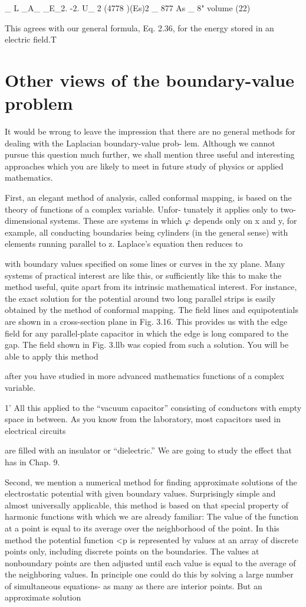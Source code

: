 _ L _A_ _E_2. -2.
U_ 2 (4778 )(Es)2 _ 877 As _ 8" volume (22)

This agrees with our general formula, Eq. 2.36, for the energy stored
in an electric field.T

\section{Other views of the boundary-value problem}

It would be wrong to leave the impression that there are no general
methods for dealing with the Laplacian boundary-value prob-
lem. Although we cannot pursue this question much further, we
shall mention three useful and interesting approaches which you are
likely to meet in future study of physics or applied mathematics.

First, an elegant method of analysis, called conformal mapping,
is based on the theory of functions of a complex variable. Unfor-
tunately it applies only to two-dimensional systems. These are systems
in which $\varphi$ depends only on x and y, for example, all conducting
boundaries being cylinders (in the general sense) with elements
running parallel to z. Laplace's equation then reduces to

with boundary values specified on some lines or curves in the xy
plane. Many systems of practical interest are like this, or sufficiently
like this to make the method useful, quite apart from its intrinsic
mathematical interest. For instance, the exact solution for the potential
around two long parallel strips is easily obtained by the
method of conformal mapping. The field lines and equipotentials
are shown in a cross-section plane in Fig. 3.16. This provides us
with the edge field for any parallel-plate capacitor in which the edge
is long compared to the gap. The field shown in Fig. 3.llb was
copied from such a solution. You will be able to apply this method

after you have studied in more advanced mathematics functions of
a complex variable.

1' All this applied to the ``vacuum capacitor'' consisting of conductors with empty space
in between. As you know from the laboratory, most capacitors used in electrical circuits

are filled with an insulator or ``dielectric.'' We are going to study the effect that has in
Chap. 9.

Second, we mention a numerical method for finding approximate
solutions of the electrostatic potential with given boundary values.
Surprisingly simple and almost universally applicable, this method
is based on that special property of harmonic functions with which
we are already familiar: The value of the function at a point is equal
to its average over the neighborhood of the point. In this method
the potential function <p is represented by values at an array of discrete
points only, including discrete points on the boundaries. The
values at nonboundary points are then adjusted until each value is
equal to the average of the neighboring values. In principle one
could do this by solving a large number of simultaneous equations-
as many as there are interior points. But an approximate solution

